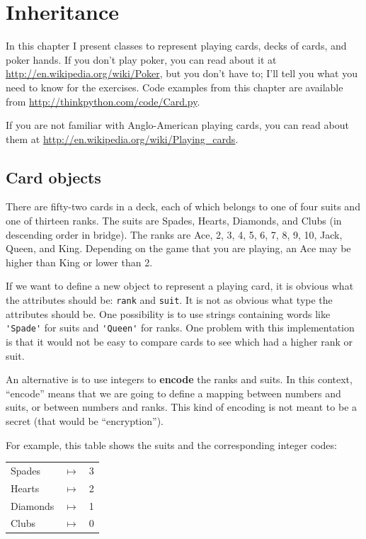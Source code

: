 \documentclass[10pt]{book}
\begin{document}
\chapter{Inheritance}

In this chapter I present classes to represent playing cards,
decks of cards, and poker hands.  If you don't play poker, you can
read about it at \url{http://en.wikipedia.org/wiki/Poker}, but you don't have
to; I'll tell you what you need to know for the exercises.
Code examples from this chapter are available from
\url{http://thinkpython.com/code/Card.py}.

If you are not familiar with Anglo-American playing cards,
you can read about them at \url{http://en.wikipedia.org/wiki/Playing_cards}.


\section{Card objects}

There are fifty-two cards in a deck, each of which belongs to one of
four suits and one of thirteen ranks.  The suits are Spades, Hearts,
Diamonds, and Clubs (in descending order in bridge).  The ranks are
Ace, 2, 3, 4, 5, 6, 7, 8, 9, 10, Jack, Queen, and King.  Depending on
the game that you are playing, an Ace may be higher than King
or lower than 2.

If we want to define a new object to represent a playing card, it is
obvious what the attributes should be: {\tt rank} and
{\tt suit}.  It is not as obvious what type the attributes
should be.  One possibility is to use strings containing words like
\verb"'Spade'" for suits and \verb"'Queen'" for ranks.  One problem with
this implementation is that it would not be easy to compare cards to
see which had a higher rank or suit.

An alternative is to use integers to {\bf encode} the ranks and suits.
In this context, ``encode'' means that we are going to define a mapping
between numbers and suits, or between numbers and ranks.  This
kind of encoding is not meant to be a secret (that
would be ``encryption'').

\newcommand{\mymapsto}{$\mapsto$}

For example, this table shows the suits and the corresponding integer
codes:

\begin{tabular}{l c l}
Spades & \mymapsto & 3 \\
Hearts & \mymapsto & 2 \\
Diamonds & \mymapsto & 1 \\
Clubs & \mymapsto & 0
\end{tabular}
\end{document}

